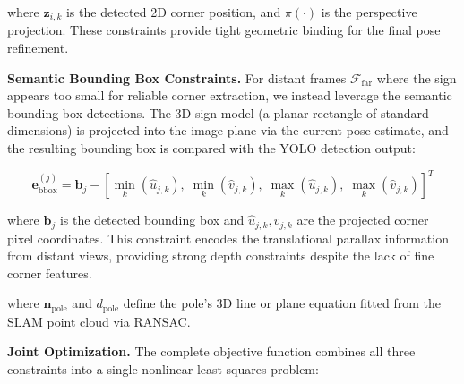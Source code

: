 \documentclass[runningheads]{llncs}
\begin{document}
where $\mathbf{z}_{i,k}$ is the detected 2D corner position, and $\pi(\cdot)$ is
the perspective projection. These constraints provide tight geometric binding for
the final pose refinement.

\noindent\textbf{Semantic Bounding Box Constraints.}
For distant frames $\mathcal{F}_{\text{far}}$ where the sign appears too small for
reliable corner extraction, we instead leverage the semantic bounding box detections.
The 3D sign model (a planar rectangle of standard dimensions) is projected into the
image plane via the current pose estimate, and the resulting bounding box is compared
with the YOLO detection output:

\begin{equation}
\mathbf{e}_{\text{bbox}}^{(j)} = \mathbf{b}_j -
\left[ \min_k(\hat{u}_{j,k}),\; \min_k(\hat{v}_{j,k}),\;
\max_k(\hat{u}_{j,k}),\; \max_k(\hat{v}_{j,k}) \right]^T
\label{eq:bbox_error}
\end{equation}

where $\mathbf{b}_j$ is the detected bounding box and $\hat{u}_{j,k}, \hat{v}_{j,k}$
are the projected corner pixel coordinates. This constraint encodes the translational
parallax information from distant views, providing strong depth constraints despite
the lack of fine corner features.


where $\mathbf{n}_{\text{pole}}$ and $d_{\text{pole}}$ define the pole's 3D line
or plane equation fitted from the SLAM point cloud via RANSAC.

\noindent\textbf{Joint Optimization.}
The complete objective function combines all three constraints into a single
nonlinear least squares problem:
\end{document}
